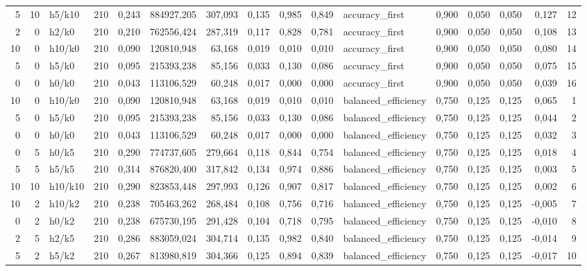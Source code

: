 \begin{longtable}{rrlrrrrrrrlrrrrr}
5 & 10 & h5/k10 & 210 & 0,243 & 884927,205 & 307,093 & 0,135 & 0,985 & 0,849 & accuracy\_first & 0,900 & 0,050 & 0,050 & 0,127 & 12 \\
2 & 0 & h2/k0 & 210 & 0,210 & 762556,424 & 287,319 & 0,117 & 0,828 & 0,781 & accuracy\_first & 0,900 & 0,050 & 0,050 & 0,108 & 13 \\
10 & 0 & h10/k0 & 210 & 0,090 & 120810,948 & 63,168 & 0,019 & 0,010 & 0,010 & accuracy\_first & 0,900 & 0,050 & 0,050 & 0,080 & 14 \\
5 & 0 & h5/k0 & 210 & 0,095 & 215393,238 & 85,156 & 0,033 & 0,130 & 0,086 & accuracy\_first & 0,900 & 0,050 & 0,050 & 0,075 & 15 \\
0 & 0 & h0/k0 & 210 & 0,043 & 113106,529 & 60,248 & 0,017 & 0,000 & 0,000 & accuracy\_first & 0,900 & 0,050 & 0,050 & 0,039 & 16 \\
10 & 0 & h10/k0 & 210 & 0,090 & 120810,948 & 63,168 & 0,019 & 0,010 & 0,010 & balanced\_efficiency & 0,750 & 0,125 & 0,125 & 0,065 & 1 \\
5 & 0 & h5/k0 & 210 & 0,095 & 215393,238 & 85,156 & 0,033 & 0,130 & 0,086 & balanced\_efficiency & 0,750 & 0,125 & 0,125 & 0,044 & 2 \\
0 & 0 & h0/k0 & 210 & 0,043 & 113106,529 & 60,248 & 0,017 & 0,000 & 0,000 & balanced\_efficiency & 0,750 & 0,125 & 0,125 & 0,032 & 3 \\
0 & 5 & h0/k5 & 210 & 0,290 & 774737,605 & 279,664 & 0,118 & 0,844 & 0,754 & balanced\_efficiency & 0,750 & 0,125 & 0,125 & 0,018 & 4 \\
5 & 5 & h5/k5 & 210 & 0,314 & 876820,400 & 317,842 & 0,134 & 0,974 & 0,886 & balanced\_efficiency & 0,750 & 0,125 & 0,125 & 0,003 & 5 \\
10 & 10 & h10/k10 & 210 & 0,290 & 823853,448 & 297,993 & 0,126 & 0,907 & 0,817 & balanced\_efficiency & 0,750 & 0,125 & 0,125 & 0,002 & 6 \\
10 & 2 & h10/k2 & 210 & 0,238 & 705463,262 & 268,484 & 0,108 & 0,756 & 0,716 & balanced\_efficiency & 0,750 & 0,125 & 0,125 & -0,005 & 7 \\
0 & 2 & h0/k2 & 210 & 0,238 & 675730,195 & 291,428 & 0,104 & 0,718 & 0,795 & balanced\_efficiency & 0,750 & 0,125 & 0,125 & -0,010 & 8 \\
2 & 5 & h2/k5 & 210 & 0,286 & 883059,024 & 304,714 & 0,135 & 0,982 & 0,840 & balanced\_efficiency & 0,750 & 0,125 & 0,125 & -0,014 & 9 \\
5 & 2 & h5/k2 & 210 & 0,267 & 813980,819 & 304,366 & 0,125 & 0,894 & 0,839 & balanced\_efficiency & 0,750 & 0,125 & 0,125 & -0,017 & 10 \\

\end{longtable}
